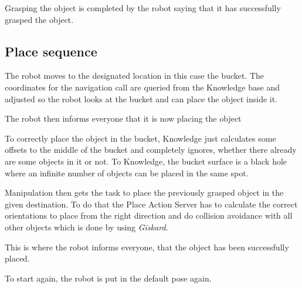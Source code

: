 \documentclass[main.tex]{subfiles}
\begin{document}
	\begin{nlp}
	Grasping the object is completed by the robot saying that it has successfully grasped the object.
	\end{nlp}
    
	\subsection{Place sequence}
	\begin{navigation}
	The robot moves to the designated location in this case the bucket.
	The coordinates for the navigation call are queried from the Knowledge base and adjusted so the robot looks at the bucket and can place the object inside it. 
	\end{navigation}
	
	\begin{nlp}
	The robot then informs everyone that it is now placing the object
	\end{nlp}

	\begin{knowledge}
	To correctly place the object in the bucket, Knowledge just calculates some offsets to the middle of the bucket and completely ignores, whether there already are some objects in it or not. To Knowledge, the bucket surface is a black hole where an infinite number of objects can be placed in the same spot.
	\end{knowledge}

	\begin{manipulation}
	 Manipulation then gets the task to place the previously grasped object in the given destination. To do that the Place Action Server has to calculate the correct orientations to place from the right direction and do collision avoidance with all other objects which is done by using \textit{Giskard}.
	 \end{manipulation}
	 
	\begin{nlp}
	This is where the robot informs everyone, that the object has been successfully placed.
	\end{nlp}

	\begin{manipulation}
	To start again, the robot is put in the default pose again.
	\end{manipulation}
	
\end{document}
